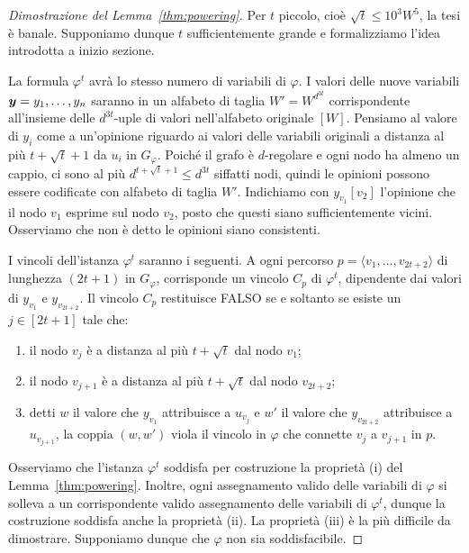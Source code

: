 \begin{proof}[Dimostrazione del Lemma~\ref{thm:powering}]
	Per $t$ piccolo, cioè $\sqrt{t} \le 10^3 W^5$, la tesi è banale. Supponiamo
	dunque $t$ sufficientemente grande e formalizziamo l'idea introdotta a
	inizio sezione.

	La formula $\varphi^t$ avrà lo stesso numero di variabili di $\varphi$.
	I valori delle nuove variabili $\bm{y} = y_1, \ldots, y_n$
	saranno in un alfabeto di taglia $W' = W^{d^{3 t}}$ corrispondente
	all'insieme delle $d^{3 t}$-uple di valori nell'alfabeto originale $[W]$.
	Pensiamo al valore di $y_i$ come a un'opinione riguardo ai valori delle
	variabili originali a distanza al più $t + \sqrt{t} + 1$ da $u_i$ in
	$G_\varphi$.
	Poiché il grafo è $d$-regolare e ogni nodo ha almeno un cappio, ci sono al
	più $d^{t + \sqrt{t} + 1} \le d^{3 t}$ siffatti nodi, quindi le opinioni
	possono essere codificate con alfabeto di taglia $W'$.
	Indichiamo con $y_{v_1}[v_2]$ l'opinione che il nodo $v_1$ esprime sul nodo
	$v_2$, posto che questi siano sufficientemente vicini.
	Osserviamo che non è detto le opinioni siano consistenti.

	I vincoli dell'istanza $\varphi^t$ saranno i seguenti.
	A ogni percorso $p = \langle v_1, \ldots, v_{2t + 2} \rangle$ di lunghezza
	$(2 t + 1)$ in $G_\varphi$, corrisponde un vincolo $C_p$ di $\varphi^t$,
	dipendente dai valori di $y_{v_1}$ e $y_{v_{2t + 2}}$.
	Il vincolo $C_p$ restituisce FALSO se e soltanto se esiste un $j \in [2t + 1]$
	tale che:
	\begin{enumerate}
		\item il nodo $v_j$ è a distanza al più $t + \sqrt{t}$ dal nodo $v_1$;
		\item il nodo $v_{j + 1}$ è a distanza al più $t + \sqrt{t}$ dal nodo
			$v_{2t+2}$;
		\item detti $w$ il valore che $y_{v_1}$ attribuisce a $u_{v_j}$ e $w'$
			il valore che $y_{v_{2 t + 2}}$ attribuisce a $u_{v_{j + 1}}$, la
			coppia $(w, w')$ viola il vincolo in $\varphi$ che connette $v_j$ a
			$v_{j + 1}$ in $p$.
	\end{enumerate}

	Osserviamo che l'istanza $\varphi^t$ soddisfa per costruzione la proprietà
	(i) del Lemma~\ref{thm:powering}.
	Inoltre, ogni assegnamento valido delle variabili di $\varphi$ si solleva a
	un corrispondente valido assegnamento delle variabili di $\varphi^t$, dunque
	la costruzione soddisfa anche la proprietà (ii).
	La proprietà (iii) è la più difficile da dimostrare. Supponiamo dunque che
	$\varphi$ non sia soddisfacibile.


\end{proof}
